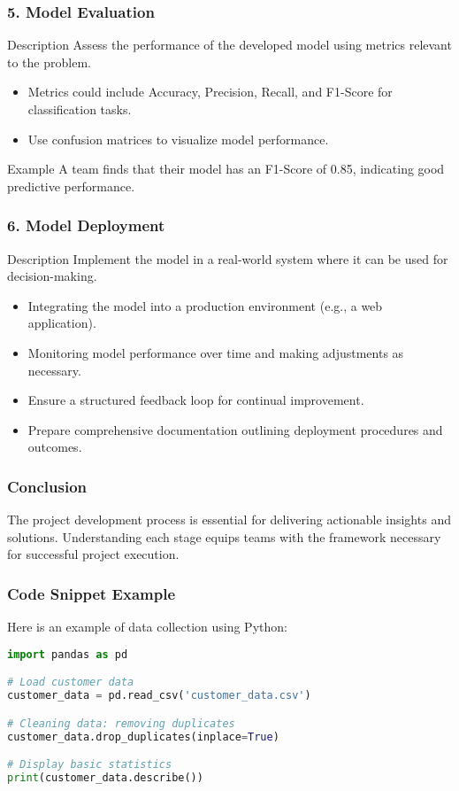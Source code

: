 \documentclass[aspectratio=169]{beamer}
\begin{document}
\begin{frame}[fragile]
    \frametitle{5. Model Evaluation}
    \begin{block}{Description}
        Assess the performance of the developed model using metrics relevant to the problem.
    \end{block}
    \begin{itemize}
        \item Metrics could include Accuracy, Precision, Recall, and F1-Score for classification tasks.
        \item Use confusion matrices to visualize model performance.
    \end{itemize}
    \begin{block}{Example}
        A team finds that their model has an F1-Score of 0.85, indicating good predictive performance.
    \end{block}
\end{frame}

\begin{frame}[fragile]
    \frametitle{6. Model Deployment}
    \begin{block}{Description}
        Implement the model in a real-world system where it can be used for decision-making.
    \end{block}
    \begin{itemize}
        \item Integrating the model into a production environment (e.g., a web application).
        \item Monitoring model performance over time and making adjustments as necessary.
    \end{itemize}
    \begin{itemize}
        \item Ensure a structured feedback loop for continual improvement.
        \item Prepare comprehensive documentation outlining deployment procedures and outcomes.
    \end{itemize}
\end{frame}

\begin{frame}[fragile]
    \frametitle{Conclusion}
    The project development process is essential for delivering actionable insights and solutions. Understanding each stage equips teams with the framework necessary for successful project execution.
\end{frame}

\begin{frame}[fragile]
    \frametitle{Code Snippet Example}
    Here is an example of data collection using Python:
    \begin{lstlisting}[language=Python]
import pandas as pd

# Load customer data
customer_data = pd.read_csv('customer_data.csv')

# Cleaning data: removing duplicates
customer_data.drop_duplicates(inplace=True)

# Display basic statistics
print(customer_data.describe())
    \end{lstlisting}
\end{frame}
\end{document}

